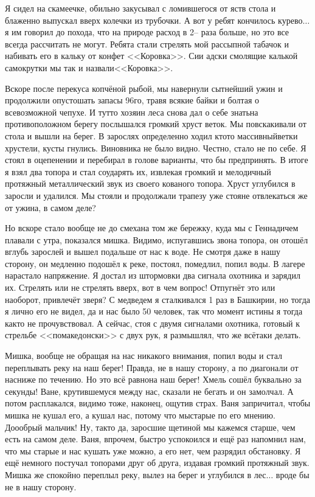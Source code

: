 Я сидел на скамеечке, обильно закусывал с ломившегося от яств стола и блаженно выпускал вверх колечки из трубочки. А вот у ребят кончилось курево$\ldots$ я им говорил до похода, что на природе расход в 2\thinspace\nobreakdash-- раза больше, но это все всегда рассчитать не могут. Ребята стали стрелять мой рассыпной табачок и набивать его в кальку от конфет <<Коровка>>. Сии адски смолящие калькой самокрутки мы так и назвали\mdash <<Коровка>>. 

Вскоре после перекуса копчёной рыбой, мы навернули сытнейший ужин и продолжили опустошать запасы 96\sdash го, травя всякие байки и болтая о всевозможной чепухе. И тут\sdash то хозяин леса снова дал о себе знать\mdash на противоположном берегу послышался громкий хруст веток. Мы повскакивали от стола и вышли на берег. В зарослях определенно ходил кто\sdash то массивный\mdash ветки хрустели, кусты гнулись. Виновника не было видно. Честно, стало не по себе. Я стоял в оцепенении и перебирал в голове варианты, что бы предпринять. В итоге я взял два топора и стал соударять их, извлекая громкий и мелодичный протяжный металлический звук из своего кованого топора. Хруст углубился в заросли и удалился. Мы стояли и продолжали трапезу уже стоя\mdash не отвлекаться же от ужина, в самом деле? 

Но вскоре стало вообще не до смеха\mdash на том же бережку, куда мы с Геннадичем плавали с утра, показался мишка. Видимо, испугавшись звона топора, он отошёл вглубь зарослей и вышел подальше от нас к воде. Не смотря даже в нашу сторону, он медленно подошёл к реке, постоял, помедлил, попил воды. В лагере нарастало напряжение. Я достал из штормовки два сигнала охотника и зарядил их. Стрелять или не стрелять вверх, вот в чем вопрос! Отпугнёт это или наоборот, привлечёт зверя? С медведем я сталкивался 1 раз в Башкирии, но тогда я лично его не видел, да и нас было 50 человек, так что момент истины я тогда как\sdash то не прочувствовал. А сейчас, стоя с двумя сигналами охотника, готовый к стрельбе <<по\sdash македонски>> с двух рук, я размышлял, что же всё\sdash таки делать. 

Мишка, вообще не обращая на нас никакого внимания, попил воды и стал переплывать реку на наш берег! Правда, не в нашу сторону, а по диагонали от нас\mdash ниже по течению. Но это всё равно\mdash на наш берег! Хмель сошёл буквально за секунды! Ване, крутившемуся между нас, сказали не бегать и он замолчал. А потом расплакался, видимо тоже, наконец, ощутив страх. Ваня запричитал, чтобы мишка не кушал его, а кушал нас, потому что мы\mdash старые по его мнению. До\sdash о\sdash о\sdash брый мальчик! Ну, так\sdash то да, заросшие щетиной мы кажемся старше, чем есть на самом деле. Ваня, впрочем, быстро успокоился и ещё раз напомнил нам, что мы старые и нас кушать уже можно, а его нет, чем разрядил обстановку. Я ещё немного постучал топорами друг об друга, издавая громкий протяжный звук. Мишка же спокойно переплыл реку, вылез на берег и углубился в лес$\ldots$ вроде бы не в нашу сторону.

